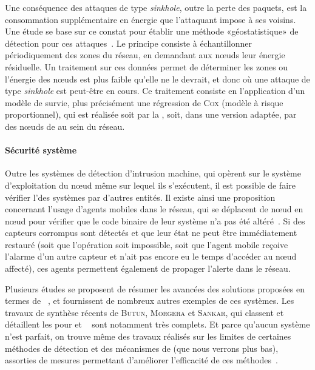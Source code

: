 Une conséquence des attaques de type \textit{sinkhole}, outre la perte des paquets, est la consommation supplémentaire en énergie que l'attaquant impose à ses voisins.
Une étude se base sur ce constat pour établir une méthode «géostatistique» de détection pour ces attaques~\cite{SKDM14}.
Le principe consiste à échantillonner périodiquement des zones du réseau, en demandant aux nœuds leur énergie résiduelle.
Un traitement sur ces données permet de déterminer les zones ou l'énergie des nœuds est plus faible qu'elle ne le devrait, et donc où une attaque de type \textit{sinkhole} est peut-être en cours.
Ce traitement consiste en l'application d'un modèle de survie, plus précisément une régression de \textsc{Cox} (modèle à risque proportionnel), qui est réalisée soit par la \sdb, soit, dans une version adaptée, par des nœuds de  au sein du réseau.

        \paragraph{Sécurité système}
        Outre les systèmes de détection d'intrusion machine, qui opèrent sur le système d'exploitation du nœud même sur lequel ils s'exécutent, il est possible de faire vérifier l'\integrite des systèmes par d'autres entités.
Il existe ainsi une proposition concernant l'usage d'agents mobiles dans le réseau, qui se déplacent de nœud en nœud pour vérifier que le code binaire de leur système n'a pas été altéré~\cite{HR13}.
Si des capteurs corrompus sont détectés et que leur état ne peut être immédiatement restauré (soit que l'opération soit impossible, soit que l'agent mobile reçoive l'alarme d'un autre capteur et n'ait pas encore eu le temps d'accéder au nœud affecté), ces agents permettent également de propager l'alerte dans le réseau.

\bigskip
Plusieurs études se proposent de résumer les avancées des solutions proposées en termes de \idss~\cite{ME13,MS14}, et fournissent de nombreux autres exemples de ces systèmes.
Les travaux de synthèse récents de \textsc{Butun, Morgera} et \textsc{Sankar}, qui classent et détaillent les \IDS pour \manet et \rcsfs~\cite{BMS13} sont notamment très complets.
Et parce qu'aucun système \IDS n'est parfait, on trouve même des travaux réalisés sur les limites de certaines méthodes de détection et des mécanismes de  (que nous verrons plus bas), assorties de mesures permettant d'améliorer l'efficacité de ces méthodes~\cite{CQW12}.
